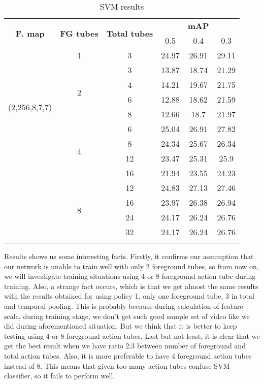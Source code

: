 \begin{center}
  \setlength{\tabcolsep}{2pt}
  \begin{longtable}{|| c | c | c || c c c||}


    \hline
    \multirow{2}{*}{\textbf{F. map}} & \multirow{2}{*}{\textbf{FG tubes}} & \multirow{2}{*}{\textbf{Total tubes}} & {} & \textbf{mAP} & {} \\
    {}  & {} & {} & 0.5 & 0.4 & 0.3 \\
    \hline
    \multirow{8}{*}{(2,256,8,7,7)} & 1 & 3 & 24.97 & 26.91 & 29.11\\
    \cline{2-6}
    {} & \multirow{4}{*}{2} & 3 & 13.87 & 18.74 & 21.29 \\
    \cline{3-6}
    {} & {} & 4 & 14.21 & 19.67 & 21.75 \\
    \cline{3-6}
    {} & {} & 6 & 12.88 & 18.62 & 21.59 \\
    \cline{3-6}
    {} & {} & 8 & 12.66 & 18.7 & 21.97 \\
    \cline{2-6}
    {} & \multirow{4}{*}{4} & 6 & 25.04 & 26.91 & 27.82  \\
    \cline{3-6}
    {} & {} &  8 & 24.34 & 25.67 & 26.34 \\
    \cline{3-6}
    {} & {} & 12 &  23.47 & 25.31 & 25.9 \\
    \cline{3-6}
    {} & {} & 16 & 21.94 & 23.55 & 24.23 \\
    \cline{2-6}
    {} & \multirow{4}{*}{8} & 12 & 24.83 & 27.13 & 27.46 \\
    \cline{3-6}
    {} & {} & 16 & 23.97 & 26.38 & 26.94 \\
    \cline{3-6}
    {} & {} & 24 & 24.17 & 26.24 & 26.76 \\
    \cline{3-6}
    {} & {} & 32 & 24.17 & 26.24 & 26.76 \\

    \hline

    \caption{SVM results }
    \label{table:svm_increased}
  \end{longtable}
\end{center}

Results shows us some interesting facts. Firstly, it confirms our assumption that our network is unable to train well with only 2 foreground tubes, so from now on,
we will investigate training situations using 4 or 8 foreground action tube during training. Also, a strange fact occurs, which is that we get almost the
same results with the results obtained for using policy 1, only one foreground tube, 3 in total and temporal pooling. This is probably because
during calculation of feature scale, during training stage, we don't get such good sample set of video like we did during aforementioned situation. But we think that it is better to
keep testing using 4 or 8 foreground action tubes. Last but not least, it is clear that we get the best result when we have ratio 2:3 between
number of foreground and total action tubes. Also, it is more preferable to have 4 foreground action tubes instead of 8. This means that given too
many action tubes confuse SVM classifier, so it fails to perform well.


